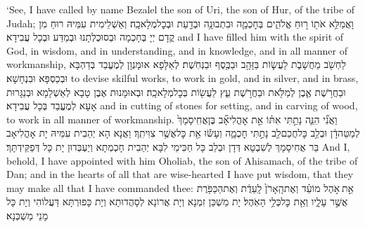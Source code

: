 {‘See, I have called by name Bezalel the son of Uri, the son of Hur, of the tribe of Judah;}{}
{וָאֲמַלֵּ֥א אֹת֖וֹ ר֣וּחַ אֱלֹהִ֑ים בְּחׇכְמָ֛ה וּבִתְבוּנָ֥ה וּבְדַ֖עַת וּבְכׇל\maqqaf מְלָאכָֽה׃}
{וְאַשְׁלֵימִית עִמֵּיהּ רוּחַ מִן קֳדָם יְיָ בְּחָכְמָה וּבְסוּכְלְתָנוּ וּבְמַדַּע וּבְכָל עֲבִידָא׃}
{and I have filled him with the spirit of God, in wisdom, and in understanding, and in knowledge, and in all manner of workmanship,}{}
{לַחְשֹׁ֖ב מַחֲשָׁבֹ֑ת לַעֲשׂ֛וֹת בַּזָּהָ֥ב וּבַכֶּ֖סֶף וּבַנְּחֹֽשֶׁת׃}
{לְאַלָּפָא אוּמָּנְוָן לְמֶעֱבַד בְּדַהְבָּא וּבְכַסְפָּא וּבִנְחָשָׁא׃}
{to devise skilful works, to work in gold, and in silver, and in brass,}{}
{וּבַחֲרֹ֥שֶׁת אֶ֛בֶן לְמַלֹּ֖את וּבַחֲרֹ֣שֶׁת עֵ֑ץ לַעֲשׂ֖וֹת בְּכׇל\maqqaf מְלָאכָֽה׃}
{וּבְאוּמָּנוּת אֶבֶן טָבָא לְאַשְׁלָמָא וּבְנַגָּרוּת אָעָא לְמֶעֱבַד בְּכָל עֲבִידָא׃}
{and in cutting of stones for setting, and in carving of wood, to work in all manner of workmanship.}{}
{וַאֲנִ֞י הִנֵּ֧ה נָתַ֣תִּי אִתּ֗וֹ אֵ֣ת אׇהֳלִיאָ֞ב בֶּן\maqqaf אֲחִֽיסָמָךְ֙ לְמַטֵּה\maqqaf דָ֔ן וּבְלֵ֥ב כׇּל\maqqaf חֲכַם\maqqaf לֵ֖ב נָתַ֣תִּי חׇכְמָ֑ה וְעָשׂ֕וּ אֵ֖ת כׇּל\maqqaf אֲשֶׁ֥ר צִוִּיתִֽךָ׃}
{וַאֲנָא הָא יְהַבִית עִמֵּיהּ יָת אָהֳלִיאָב בַּר אֲחִיסָמָךְ לְשִׁבְטָא דְּדָן וּבְלֵב כָּל חַכִּימֵי לִבָּא יְהַבִית חָכְמְתָא וְיַעְבְּדוּן יָת כָּל דְּפַקֵּידְתָּךְ׃}
{And I, behold, I have appointed with him Oholiab, the son of Ahisamach, of the tribe of Dan; and in the hearts of all that are wise-hearted I have put wisdom, that they may make all that I have commanded thee:}{}
{אֵ֣ת \legarmeh  אֹ֣הֶל מוֹעֵ֗ד וְאֶת\maqqaf הָֽאָרֹן֙ לָֽעֵדֻ֔ת וְאֶת\maqqaf הַכַּפֹּ֖רֶת אֲשֶׁ֣ר עָלָ֑יו וְאֵ֖ת כׇּל\maqqaf כְּלֵ֥י הָאֹֽהֶל׃}
{יָת מַשְׁכַּן זִמְנָא וְיָת אֲרוֹנָא לְסָהֲדוּתָא וְיָת כָּפוּרְתָּא דַּעֲלוֹהִי וְיָת כָּל מָנֵי מַשְׁכְּנָא׃}

